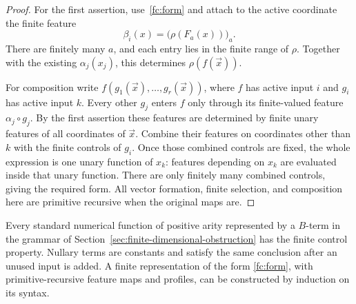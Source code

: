 \begin{proof}
For the first assertion, use~\eqref{fc:form} and attach to the active
coordinate the finite feature
\[
                 \beta_i(x)=\bigl(\rho(F_a(x))\bigr)_a.
\]
There are finitely many $a$, and each entry lies in the finite range of
$\rho$. Together with the existing $\alpha_j(x_j)$, this determines
$\rho(f(\vec x))$.

For composition write $f(g_1(\vec x),\ldots,g_r(\vec x))$, where $f$
has active input $i$ and $g_i$ has active input $k$. Every other $g_j$
enters $f$ only through its finite-valued feature $\alpha_j\circ g_j$.
By the first assertion these features are determined by finite unary
features of all coordinates of $\vec x$. Combine their features on
coordinates other than $k$ with the finite controls of $g_i$. Once those
combined controls are fixed, the whole expression is one unary function
of $x_k$: features depending on $x_k$ are evaluated inside that unary
function. There are only finitely many combined controls, giving the
required form. All vector formation, finite selection, and composition
here are primitive recursive when the original maps are.
\end{proof}

\begin{theorem}
\label{fc:B-theorem}
Every standard numerical function of positive arity represented by a
$B$-term in the grammar of
Section~\ref{sec:finite-dimensional-obstruction} has the finite control
property. Nullary terms are constants and satisfy the same conclusion
after an unused input is added. A finite representation of the form
\eqref{fc:form}, with primitive-recursive feature maps and profiles, can
be constructed by induction on its syntax.
\end{theorem}


